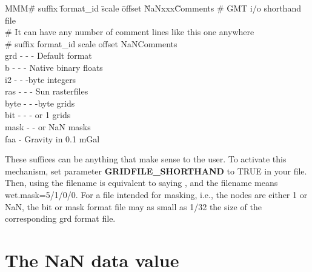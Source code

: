 \noindent
\begin{tabbing}
MMM\=\# suffix \=format\_id \=scale \=offset \=NaNxxx\=Comments \kill 
\>\# GMT i/o shorthand file \\ 
\>\# It can have any number of comment lines like this one anywhere \\
\>\# suffix \> format\_id	\> scale \> offset \>NaN\>Comments \\ 
\>grd  \> - \> - \> - \>Default format \\ 
\>b  \> - \> - \> - \> Native binary floats \\ 
\>i2  \> - \> -  -byte integers \\ 
\>ras  \> - \> - \> - \> Sun rasterfiles \\ 
\>byte  \> - \> -  -byte grids \\ 
\>bit  \> - \> - \> -  or 1 grids \\ 
\>mask  \> - \> -   or NaN masks \\ 
\>faa   \> -  \> Gravity in 0.1 mGal
\end{tabbing} 

These suffices can be anything that make sense to the user.  To
activate this mechanism, set parameter {\bf GRIDFILE\_SHORTHAND} to TRUE in
your  file.  Then, using the filename
 is equivalent to saying ,
and the filename  means wet.mask=5/1/0/0.  For a
file intended for masking, i.e., the nodes are either 1 or NaN,
the bit or mask format file may as small as 1/32 the size of the
corresponding grd format file. 

\section{The NaN data value}

